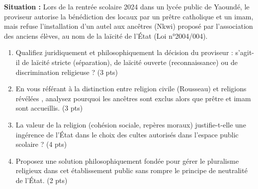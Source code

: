 \documentclass[11pt]{article}
\begin{document}
\begin{exercice}
\textbf{Situation :} Lors de la rentrée scolaire 2024 dans un lycée public de Yaoundé, le proviseur autorise la bénédiction des locaux par un prêtre catholique et un imam, mais refuse l'installation d'un autel aux ancêtres (Nkwi) proposé par l'association des anciens élèves, au nom de la \og laïcité de l'État \fg{} (Loi n°2004/004).

\begin{enumerate}
    \item Qualifiez juridiquement et philosophiquement la décision du proviseur : s'agit-il de laïcité stricte (séparation), de laïcité ouverte (reconnaissance) ou de discrimination religieuse ? (3 pts)
    \item En vous référant à la distinction entre \og religion civile \fg{} (Rousseau) et \og religions révélées \fg{}, analysez pourquoi les ancêtres sont exclus alors que prêtre et imam sont accueillis. (3 pts)
    \item La \og valeur de la religion \fg{} (cohésion sociale, repères moraux) justifie-t-elle une ingérence de l'État dans le choix des cultes autorisés dans l'espace public scolaire ? (4 pts)
    \item Proposez une solution philosophiquement fondée pour gérer le pluralisme religieux dans cet établissement public sans rompre le principe de neutralité de l'État. (2 pts)
\end{enumerate}
\end{exercice}
\end{document}

